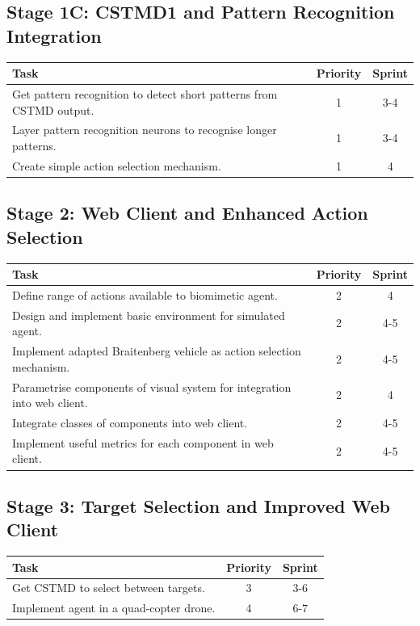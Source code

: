 \documentclass[a4paper,11pt]{article}
\begin{document}
\subsection{Stage 1C: CSTMD1 and Pattern Recognition Integration}
\begin{center}
    \begin{tabular}{p{12cm} c c}
    \textbf{Task} & \textbf{Priority} & \textbf{Sprint} \\ \hline
	Get pattern recognition to detect short patterns from CSTMD output. & 1 & 3-4 \\
	Layer pattern recognition neurons to recognise longer patterns. & 1 & 3-4\\
	Create simple action selection mechanism. & 1 & 4 \\
    \end{tabular}
\end{center}

\subsection{Stage 2: Web Client and Enhanced Action Selection}
\begin{center}
    \begin{tabular}{p{12cm} c c}
    \textbf{Task} & \textbf{Priority} & \textbf{Sprint} \\ \hline
    Define range of actions available to biomimetic agent. & 2 & 4 \\
    Design and implement basic environment for simulated agent. & 2 & 4-5 \\
    Implement adapted Braitenberg vehicle as action selection mechanism. & 2 & 4-5 \\
	Parametrise components of visual system for integration into web client. & 2 & 4 \\
	Integrate classes of components into web client. & 2 & 4-5 \\	
	Implement useful metrics for each component in web client. & 2 & 4-5 \\
    \end{tabular}
\end{center}

\subsection{Stage 3: Target Selection and Improved Web Client}
\begin{center}
    \begin{tabular}{p{12cm} c c}
    \textbf{Task} & \textbf{Priority} & \textbf{Sprint} \\ \hline
    Get CSTMD to select between targets. & 3 & 3-6 \\
    Implement agent in a quad-copter drone. & 4 & 6-7 \\
    \end{tabular}
\end{center}
\end{document}
